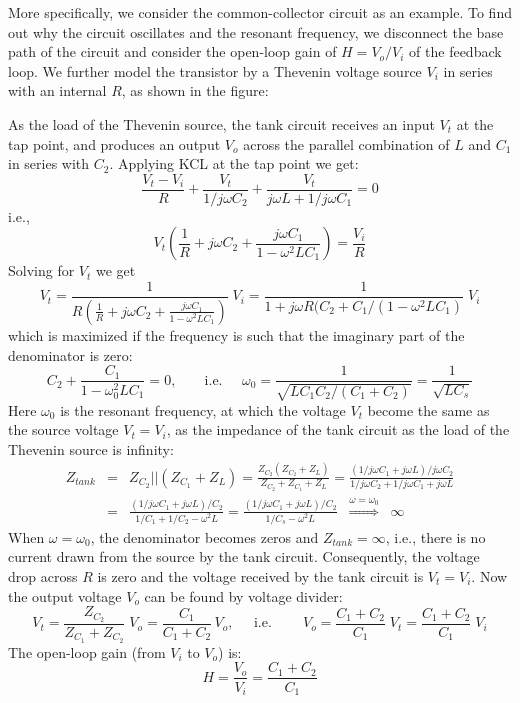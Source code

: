 \documentclass{article}
\begin{document}
More specifically, we consider the common-collector circuit as an example.
To find out why the circuit oscillates and the resonant frequency, we 
disconnect the base path of the circuit and consider the open-loop gain 
of $H=V_o/V_i$ of the feedback loop. We further model the transistor 
by a Thevenin voltage source $V_i$ in series with an internal $R$, as 
shown in the figure:


As the load of the Thevenin source, the tank circuit receives an input 
$V_t$ at the tap point, and produces an output $V_o$ across the parallel
combination of $L$ and $C_1$ in series with $C_2$. Applying KCL at the tap 
point we get:
\begin{equation}
\frac{V_t-V_i}{R}+\frac{V_t}{1/j\omega C_2}+\frac{V_t}{j\omega L+1/j\omega C_1}=0
\end{equation}
i.e.,
\begin{equation}
V_t\left(\frac{1}{R}+j\omega C_2+\frac{j\omega C_1}{1-\omega^2LC_1}\right)
=\frac{V_i}{R}
\end{equation}
Solving for $V_t$ we get
\begin{equation}
V_t=\frac{1}{R(\frac{1}{R}+j\omega C_2+\frac{j\omega C_1}
{1-\omega^2LC_1})}\;V_i
=\frac{1}{1+j\omega R(C_2+C_1/(1-\omega^2LC_1)}\;V_i
\end{equation}
which is maximized if the frequency is such that the imaginary part of 
the denominator is zero:
\begin{equation}
C_2+\frac{C_1}{1-\omega_0^2LC_1}=0,\;\;\;\;\;\;\;\mbox{i.e.}\;\;\;\;\;
\omega_0=\frac{1}{\sqrt{LC_1C_2/(C_1+C_2)}}=\frac{1}{\sqrt{LC_s}}
\end{equation}
Here $\omega_0$ is the resonant frequency, at which the voltage $V_t$ 
become the same as the source voltage $V_t=V_i$, as the impedance of
the tank circuit as the load of the Thevenin source is infinity:
\begin{eqnarray}
  Z_{tank}&=&Z_{C_2}||(Z_{C_1}+Z_L)=\frac{Z_{C_2}(Z_{C_2}+Z_L)}{Z_{C_2}+Z_{C_1}+Z_L}
  =\frac{(1/j\omega C_1+j\omega L)/j\omega C_2}
  {1/j\omega C_2+1/j\omega C_1+j\omega L}
  \nonumber\\
  &=&\frac{(1/j\omega C_1+j\omega L)/C_2}{1/C_1+1/C_2-\omega^2 L}
  =\frac{(1/j\omega C_1+j\omega L)/C_2}{1/C_s-\omega^2 L}
  \;\;\stackrel{\omega=\omega_0}{\Longrightarrow}\;\;\infty
\end{eqnarray}
When $\omega=\omega_0$, the denominator becomes zeros and $Z_{tank}=\infty$,
i.e., there is no current drawn from the source by the tank circuit. 
Consequently, the voltage drop across $R$ is zero and the voltage received 
by the tank circuit is $V_t=V_i$. Now the output voltage $V_o$ can be found 
by voltage divider:
\begin{equation}
V_t=\frac{Z_{C_2}}{Z_{C_1}+Z_{C_2}}\;V_o=\frac{C_1}{C_1+C_2}\,V_o,
\;\;\;\;\;\mbox{i.e.}\;\;\;\;\;\;\;\;
V_o=\frac{C_1+C_2}{C_1}\;V_t=\frac{C_1+C_2}{C_1}\;V_i
\end{equation}
The open-loop gain (from $V_i$ to $V_o$) is:
\begin{equation}
H=\frac{V_o}{V_i}=\frac{C_1+C_2}{C_1}
\end{equation}
\end{document}
